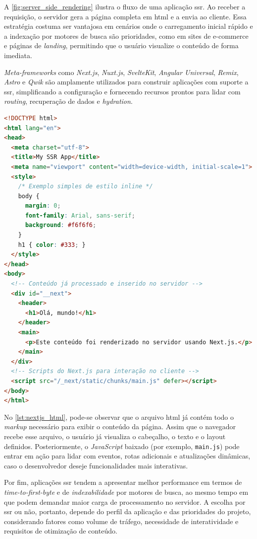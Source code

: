 A \autoref{fig:server_side_rendering} ilustra o fluxo de uma aplicação \acrshort{ssr}. Ao receber a requisição, o servidor gera a página completa em \acrshort{html} e a envia ao cliente. Essa estratégia costuma ser vantajosa em cenários onde o carregamento inicial rápido e a indexação por motores de busca são prioridades, como em sites de e-commerce e páginas de \emph{landing}, permitindo que o usuário visualize o conteúdo de forma imediata. 

\emph{Meta-\-frameworks} como \emph{Next.js}, \emph{Nuxt.js}, \emph{SvelteKit}, \emph{Angular Universal}, \emph{Remix}, \emph{Astro} e \emph{Qwik} são amplamente utilizados para construir aplicações com suporte a \acrshort{ssr}, simplificando a configuração e fornecendo recursos prontos para lidar com \emph{routing}, recuperação de dados e \emph{hydration}. 

\begin{lstlisting}[language=html, caption={Exemplo de HTML mínimo em aplicação Next.js com SSR}, label={lst:nextjs_html}]
<!DOCTYPE html>
<html lang="en">
<head>
  <meta charset="utf-8">
  <title>My SSR App</title>
  <meta name="viewport" content="width=device-width, initial-scale=1">
  <style>
    /* Exemplo simples de estilo inline */
    body {
      margin: 0;
      font-family: Arial, sans-serif;
      background: #f6f6f6;
    }
    h1 { color: #333; }
  </style>
</head>
<body>
  <!-- Conteúdo já processado e inserido no servidor -->
  <div id="__next">
    <header>
      <h1>Olá, mundo!</h1>
    </header>
    <main>
      <p>Este conteúdo foi renderizado no servidor usando Next.js.</p>
    </main>
  </div>
  <!-- Scripts do Next.js para interação no cliente -->
  <script src="/_next/static/chunks/main.js" defer></script>
</body>
</html>
\end{lstlisting}

No \autoref{lst:nextjs_html}, pode-se observar que o arquivo \acrshort{html} já contém todo o \emph{markup} necessário para exibir o conteúdo da página. Assim que o navegador recebe esse arquivo, o usuário já visualiza o cabeçalho, o texto e o layout definidos. Posteriormente, o \emph{JavaScript} baixado (por exemplo, \texttt{main.js}) pode entrar em ação para lidar com eventos, rotas adicionais e atualizações dinâmicas, caso o desenvolvedor deseje funcionalidades mais interativas.

Por fim, aplicações \acrshort{ssr} tendem a apresentar melhor performance em termos de \emph{time-to-first-byte} e de \emph{indexabilidade} por motores de busca, ao mesmo tempo em que podem demandar maior carga de processamento no servidor. A escolha por \acrshort{ssr} ou não, portanto, depende do perfil da aplicação e das prioridades do projeto, considerando fatores como volume de tráfego, necessidade de interatividade e requisitos de otimização de conteúdo.

